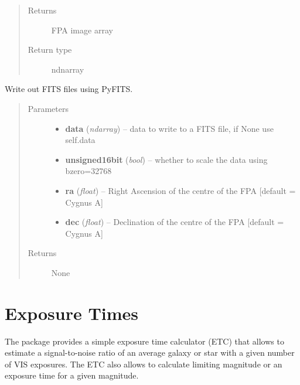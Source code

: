 \documentclass[a4paper,11pt,english]{sphinxmanual}
\begin{document}
\begin{fulllineitems}
\begin{fulllineitems}
\begin{quote}
\begin{description}
\begin{itemize}
\end{itemize}

\item[{Returns}] \leavevmode
FPA image array

\item[{Return type}] \leavevmode
ndnarray

\end{description}\end{quote}

\end{fulllineitems}


\begin{fulllineitems}
\label{postproc:postproc.tileFPA.tileFPA.writeFITSfile}
Write out FITS files using PyFITS.
\begin{quote}\begin{description}
\item[{Parameters}] \leavevmode\begin{itemize}
\item {} 
\textbf{data} (\emph{ndarray}) -- data to write to a FITS file, if None use self.data

\item {} 
\textbf{unsigned16bit} (\emph{bool}) -- whether to scale the data using bzero=32768

\item {} 
\textbf{ra} (\emph{float}) -- Right Ascension of the centre of the FPA {[}default = Cygnus A{]}

\item {} 
\textbf{dec} (\emph{float}) -- Declination of the centre of the FPA {[}default = Cygnus A{]}

\end{itemize}

\item[{Returns}] \leavevmode
None

\end{description}\end{quote}

\end{fulllineitems}


\end{fulllineitems}



\chapter{Exposure Times}
\label{index:exposure-times}
The package provides a simple exposure time calculator (ETC) that allows to estimate a signal-to-noise ratio
of an average galaxy or star with a given number of VIS exposures. The ETC also allows to calculate limiting
magnitude or an exposure time for a given magnitude.
\end{document}
